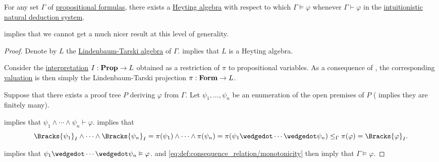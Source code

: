 \begin{theorem}\label{thm:intuitionistic_propositional_completeness}
  For any set \( \Gamma \) of \hyperref[def:propositional_syntax/formula]{propositional formulas}, there exists a \hyperref[def:heyting_algebra]{Heyting algebra} with respect to which \( \Gamma \vDash \varphi \) whenever \( \Gamma \vdash \varphi \) in the \hyperref[def:propositional_natural_deduction_systems]{intuitionistic natural deduction system}.
\end{theorem}
\begin{comments}
  \item {} implies that we cannot get a much nicer result at this level of generality.
\end{comments}
\begin{proof}
  Denote by \( L \) the \hyperref[def:lindenbaum_tarski_algebra]{Lindenbaum-Tarski algebra} of \( \Gamma \).  implies that \( L \) is a Heyting algebra.

  Consider the \hyperref[def:propositional_valuation/interpretation]{interpretation} \( I: \op*{Prop} \to L \) obtained as a restriction of \( \pi \) to propositional variables. As a consequence of , the corresponding \hyperref[def:propositional_valuation/formula_valuation]{valuation} is then simply the Lindenbaum-Tarski projection \( \pi: \op*{Form} \to L \).

  Suppose that there exists a proof tree \( P \) deriving \( \varphi \) from \( \Gamma \). Let \( \psi_1, \ldots, \psi_n \) be an enumeration of the open premises of \( P \) ( implies they are finitely many).

   implies that \( \psi_1 \wedge \cdots \wedge \psi_n \vdash \varphi \).  implies that
  \begin{equation*}
    \Bracks{\psi_1}_I \wedge \cdots \wedge \Bracks{\psi_n}_I
    =
    \pi(\psi_1) \wedge \cdots \wedge \pi(\psi_n)
    =
    \pi(\psi_1 \synwedge \cdots \synwedge \psi_n)
    \leq_\Gamma
    \pi(\varphi)
    =
    \Bracks{\varphi}_I.
  \end{equation*}

   implies that \( \psi_1 \synwedge \cdots \synwedge \psi_n \vDash \varphi \).  and \eqref{eq:def:consequence_relation/monotonicity} then imply that \( \Gamma \vDash \varphi \).
\end{proof}

